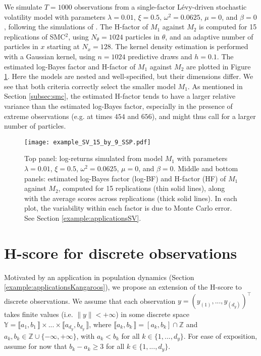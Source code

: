 \documentclass[12pt]{article}
\theoremstyle{plain}
\theoremstyle{definition}
\begin{document}
	We simulate $T=1000$ observations from a single-factor L\'{e}vy-driven
	stochastic volatility model with parameters $\lambda=0.01$, $\xi = 0.5$,
	$\omega^2=0.0625$, $\mu=0$, and $\beta=0$, following the simulations of  \citet{bns:real}. 
	The H-factor of $M_1$ against
	$M_2$ is computed for 15 replications of
	SMC$^2$, using $N_\theta = 1024$ particles in $\theta$, and an adaptive number
	of particles in $x$ starting at $N_x = 128$. The kernel density estimation is
	performed with a Gaussian kernel, using $n = 1024$ predictive draws and
	$h=0.1$. 
	The estimated log-Bayes factor and H-factor of $M_1$ against $M_2$ are plotted
	in Figure \ref{fig:SV_AllinOne}. Here the models are nested and well-specified, but their dimensions differ.  We see that both criteria
	correctly select the smaller model $M_1$. As mentioned in Section \ref{subsec:smc}, the estimated H-factor tends to have a larger relative variance than the estimated log-Bayes factor, especially in the presence of extreme observations (e.g.\! at times $454$ and $656$), and might thus call for a larger number of particles.
	\begin{figure}[h]
		\texttt{[image: example\_SV\_15\_by\_9\_SSP.pdf]}
		\centering
		\caption{Top panel: log-returns simulated from model $M_1$ with parameters $\lambda=0.01$, $\xi = 0.5$, $\omega^2=0.0625$, $\mu=0$, and $\beta=0$. Middle and bottom panels: estimated log-Bayes factor (log-BF) and H-factor (HF) of $M_1$ against $M_2$, computed for 15 replications (thin solid lines), along with the average scores across replications (thick solid lines). In each plot, the variability within each factor is due to Monte Carlo error. See Section \ref{example:applicationsSV}.}
		\label{fig:SV_AllinOne}
	\end{figure}
	\section{H-score for discrete observations}
	\label{sec:discrete}
	Motivated by an application in population dynamics (Section
	\ref{example:applicationsKangaroos}), we propose an extension of the H-score to
	discrete observations. We assume that each observation
	$y=(y_{(1)},...,y_{(d_y)})^\top$ takes finite
	values (i.e.\! $\|y\|<+\infty$) in some discrete space $\mathbb{Y}=\llbracket
	a_1,b_1\, \rrbracket\times...\times\llbracket a_{d_y},b_{d_y}\, \rrbracket$,
	where ${\llbracket a_k,b_k\, \rrbracket=[a_k,b_k]}\cap\mathbb{Z}$ and ${a_k,b_k
		\in \mathbb{Z}\cup\{-\infty,+\infty\}}$, with $a_k<b_k$ for all
	$k\in\{1,...,d_y\}$. For ease of exposition, assume for now that $b_k-a_k\geq 3$ for all
	$k\in\{1,...,d_y\}$.
\end{document}
